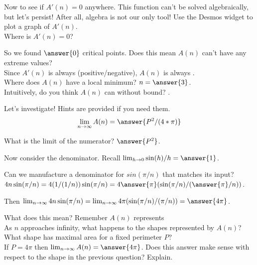 \documentclass[handout,nooutcomes]{ximera}
\begin{document}
\bigskip

\hspace{2cm}Now to see if $A'(n)=0$ anywhere. This function can't be solved algebraically, but let's persist! After all, algebra is not our only tool! Use the Desmos widget to plot a graph of $A'(n)$.\\
Where is $A'(n)=0$?\\ %

\bigskip

\hspace{2cm}So we found $\answer{0}$ critical points. Does this mean $A(n)$ can't have any extreme values?\\ %
Since $A'(n)$ is always (positive/negative), $A(n)$ is always .\\
Where does $A(n)$ have a local minimum? $n = \answer{3}$.\\
Intuitively, do you think $A(n)$ can  without bound? .\\ %

\medksip

\begin{exercise}
Let's investigate! Hints are provided if you need them.\\
\[\lim_{n \to \infty}A(n) = \answer{P^2/(4*\pi)}\]
\begin{hint}
	What is the limit of the numerator? $\answer{P^2}$.
\end{hint}
\begin{hint}
  Now consider the denominator. Recall $\lim_{h \to 0} \sin(h)/h = \answer{1}$.
\end{hint}
\begin{hint}
  Can we manufacture a denominator for $sin(\pi/n)$ that matches its input?\\
  $4n\sin(\pi/n) = 4(1/(1/n))\sin(\pi/n) = 4\answer{\pi}(\sin(\pi/n)/(\answer{\pi}/n))$.
\end{hint}
\begin{hint}
  Then $\lim_{n \to \infty} 4n\sin(\pi/n) = \lim_{n \to \infty} 4\pi(\sin(\pi/n)/(\pi/n)) = \answer{4\pi}$.
\end{hint}
\end{exercise}

What does this mean? Remember $A(n)$ represents\\ %
As $n$ approaches infinity, what happens to the shapes represented by $A(n)$?\\ %

What shape has maximal area for a fixed perimeter $P$?\\ %
If $P = 4\pi$ then $\lim_{n \to \infty} A(n) = \answer{4\pi}$. Does this answer make sense with respect to the shape in the previous question? Explain.\\ %
\end{document}
